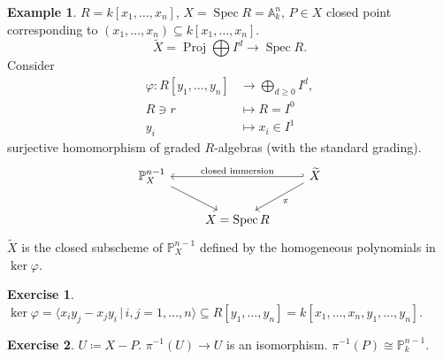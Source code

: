 \documentclass[12pt]{article}
\DeclareMathOperator{\Spec}{Spec}
\DeclareMathOperator{\Proj}{Proj}
\theoremstyle{definition}
\newtheorem*{exercise}{Exercise}
\newtheorem*{example}{Example}
\theoremstyle{remark}
\begin{document}
\begin{example}
$R=k[x_1,\ldots,x_n]$, $X=\Spec R=\mathbb{A}_k^n$, $P\in X$ closed point corresponding to $(x_1,\ldots,x_n)\subseteq k[x_1,\ldots,x_n]$.
\[\widetilde{X}=\Proj\bigoplus I^d\longrightarrow\Spec R.\]
Consider
\begin{align*}
\varphi:R[y_1,\ldots,y_n]&\longrightarrow\bigoplus_{d\geq0}I^d,\\
R\ni r&\longmapsto R=I^0\\
y_i&\longmapsto x_i\in I^1
\end{align*}
surjective homomorphism of graded $R$-algebras (with the standard grading).
\[
\begin{tikzcd}
\mathbb{P}_X^{n-1}\arrow[rd]&&\widetilde{X}\arrow[ll,hook',"\text{closed immersion}",swap]\arrow[ld,"\pi"]\\
&X=\Spec R
\end{tikzcd}
\]
$\widetilde{X}$ is the closed subscheme of $\mathbb{P}_X^{n-1}$ defined by the homogeneous polynomials in $\ker\varphi$.

\begin{exercise}
$\ker\varphi=\langle x_iy_j-x_jy_i\,|\,i,j=1,\ldots,n\rangle\subseteq R[y_1,\ldots,y_n]=k[x_1,\ldots,x_n,y_1,\ldots,y_n]$.
\end{exercise}

\begin{exercise}
$U\coloneqq X-P$. $\pi^{-1}(U)\rightarrow U$ is an isomorphism. $\pi^{-1}(P)\cong\mathbb{P}_k^{n-1}$.
\end{exercise}
\end{example}
\end{document}
